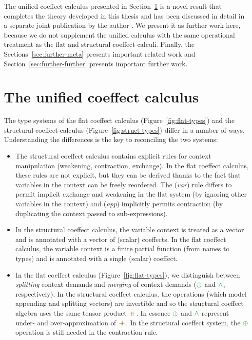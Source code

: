 \noindent
The unified coeffect calculus presented in Section~\ref{sec:further-unified} is a novel result that
completes the theory developed in this thesis and has been discussed in detail in a separate
joint publication by the author \cite{coeffects-icfp14}. We present it as further work here,
because we do not supplement the unified calculus with the same operational treatment as the flat
and structural coeffect calculi. Finally, the Sections~\ref{sec:further-meta} presents
important related work and Section~\ref{sec:further-further} presents important further work.


\section{The unified coeffect calculus}
\label{sec:further-unified}

The type systems of the flat coeffect calculus (Figure~\ref{fig:flat-types}) and the structural
coeffect calculus (Figure~\ref{fig:struct-types}) differ in a number of ways. Understanding the
differences is the key to reconciling the two systems:

\begin{itemize}
\item The structural coeffect calculus contains explicit rules for context manipulation
  (weakening, contraction, exchange). In the flat coeffect calculus, these rules are not
  explicit, but they can be derived thanks to the fact that variables in the context can be
  freely reordered. The (\emph{var}) rule differs to permit implicit exchange and weakening
  in the flat system (by ignoring other variables in the context) and (\emph{app}) implicitly
  permits contraction (by duplicating the context passed to sub-expressions).

\item In the structural coeffect calculus, the variable context is treated as a vector
  and is annotated with a vector of (scalar) coeffects. In the flat coeffect calculus,
  the variable context is a finite partial function (from names to types) and is annotated with
  a single (scalar) coeffect.

\item In the flat coeffect calculus (Figure~\ref{fig:flat-types}), we distinguish between
  \emph{splitting} context demands and \emph{merging} of context demands ($\cpar$ and $\czip$,
  respectively). In the structural coeffect calculus, the operations (which model appending and
  splitting vectors) are invertible and so the structural coeffect algebra uses the same tensor
  product $\atimes$. In essence $\cpar$ and $\czip$ represent under- and over-approximation of
  $\atimes$. In the structural coeffect system, the $\cpar$ operation is still needed
  in the contraction rule.
\end{itemize}

